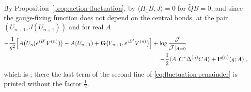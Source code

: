 \documentclass[11pt]{preprint}
\numberwithin{equation}{section}
\begin{document}
By Proposition~\ref{prop:action-fluctuation}, by $\langle H_1B, J\rangle = 0$ for $\tilde QB = 0$, and since the gauge-fixing function does not depend on the central bonds, at the pair $(U_{n+1}, J(U_{n+1}))$ and for real $A$
\begin{equation}\label{eq:fluctuation-weight}
\begin{aligned}
    -\frac{1}{g^2}\Bigl[A\bigl(U_n(e^{iB'}V^{(n)})\bigr) - A(U_{n+1}) + \mathbf G\bigl(\Gamma_{n+1}, e^{iB'}V^{(n)}\bigr)\Bigr] &+ \log\frac{\mathcal J}{\mathcal J|_{A=0}}\\
    &= -\frac{1}{2}\langle A, C^*\Delta^{(n)}CA\rangle + \mathbf P^{(n)}(g; A)\;,
\end{aligned}
\end{equation}
which is \cite[(2.10)--(2.12), pp.~267--268]{BalabanRG1}; there the last term of the second line of \eqref{eq:fluctuation-remainder} is printed without the factor $\frac{1}{2}$.
\end{document}
